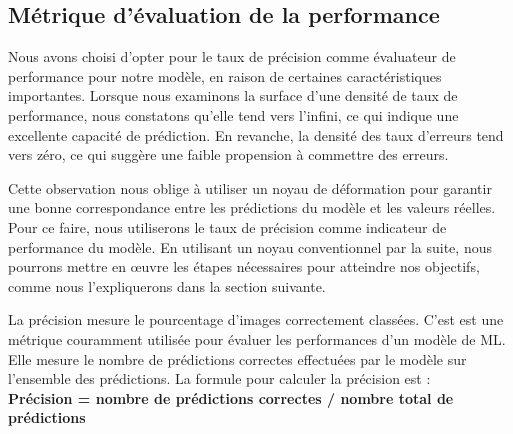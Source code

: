 \subsection{Métrique d'évaluation de la performance}
Nous avons choisi d'opter pour le taux de précision comme évaluateur de performance pour notre modèle, en raison de certaines caractéristiques importantes. Lorsque nous examinons la surface d'une densité de taux de performance, nous constatons qu'elle tend vers l'infini, ce qui indique une excellente capacité de prédiction. En revanche, la densité des taux d'erreurs tend vers zéro, ce qui suggère une faible propension à commettre des erreurs.

Cette observation nous oblige à utiliser un noyau de déformation pour garantir une bonne correspondance entre les prédictions du modèle et les valeurs réelles. Pour ce faire, nous utiliserons le taux de précision comme indicateur de performance du modèle. En utilisant un noyau conventionnel par la suite, nous pourrons mettre en œuvre les étapes nécessaires pour atteindre nos objectifs, comme nous l'expliquerons dans la section suivante.

La précision mesure le pourcentage d'images correctement classées. C’est est une métrique couramment utilisée pour évaluer les performances d'un modèle de ML. Elle mesure le nombre de prédictions correctes effectuées par le modèle sur l'ensemble des prédictions. La formule pour calculer la précision est : \\

\textbf{Précision = nombre de prédictions correctes / nombre total de prédictions}


